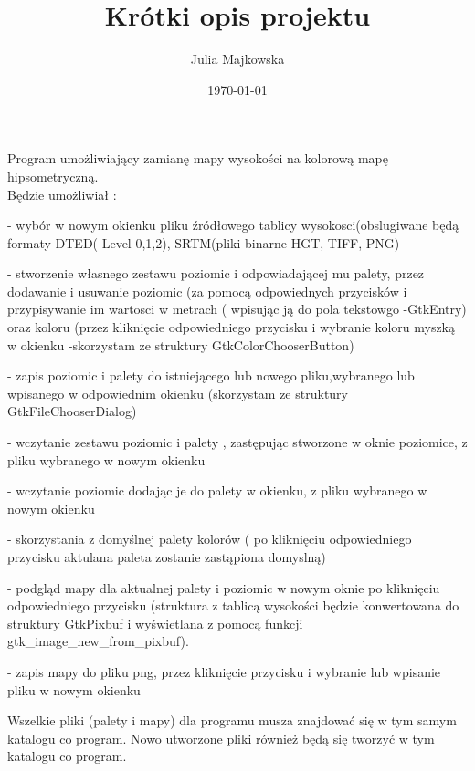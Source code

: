 \documentclass[a4paper]{article}
\author{Julia Majkowska}
\title{Krótki opis projektu}
\date{\today}
\begin{document}
 \maketitle
 Program umożliwiający zamianę mapy wysokości na kolorową mapę hipsometryczną. \\
 Będzie umożliwiał :
 
 - wybór w nowym okienku pliku źródłowego tablicy wysokosci(obslugiwane będą formaty DTED( Level 0,1,2), SRTM(pliki binarne HGT, TIFF, PNG)
 
 - stworzenie własnego zestawu poziomic i odpowiadającej mu palety, przez dodawanie i usuwanie poziomic (za pomocą odpowiednych przycisków i przypisywanie im wartosci w metrach ( wpisując ją do pola tekstowgo -GtkEntry) oraz koloru (przez kliknięcie odpowiedniego przycisku i wybranie koloru myszką w okienku -skorzystam ze struktury GtkColorChooserButton)
 
 - zapis poziomic i palety do istniejącego lub nowego pliku,wybranego lub wpisanego w odpowiednim okienku (skorzystam ze struktury GtkFileChooserDialog)
 
 - wczytanie zestawu poziomic i palety , zastępując stworzone w oknie poziomice, z pliku wybranego w nowym okienku
 
 - wczytanie poziomic dodając je do palety w okienku, z pliku wybranego w nowym okienku
 
 - skorzystania z domyślnej palety kolorów ( po kliknięciu odpowiedniego przycisku aktulana paleta zostanie zastąpiona domyslną)
 
 - podgląd mapy dla aktualnej palety i poziomic w nowym oknie po kliknięciu odpowiedniego przycisku (struktura z tablicą wysokości będzie konwertowana do struktury GtkPixbuf i wyświetlana z pomocą funkcji gtk_image_new_from_pixbuf).
 
 - zapis mapy do pliku png, przez kliknięcie przycisku i wybranie lub wpisanie pliku w nowym okienku 
 

Wszelkie pliki (palety i mapy)  dla programu musza znajdować się w tym samym katalogu co program. Nowo utworzone pliki również będą się tworzyć w tym katalogu co program.

 
\end{document}
